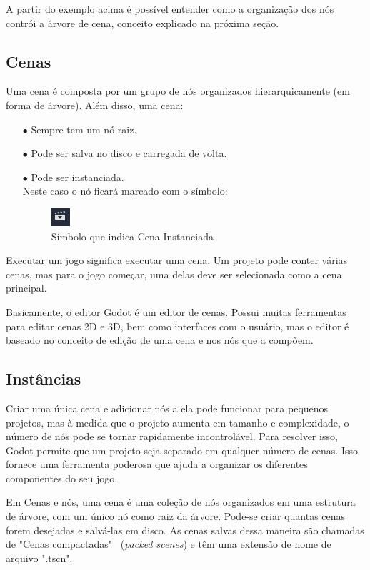 A partir do exemplo acima é possível entender como a organização dos nós
contrói a árvore de cena, conceito explicado na próxima seção.

\subsection{Cenas}

Uma cena é composta por um grupo de nós organizados hierarquicamente 
(em forma de árvore). Além disso, uma cena:

\begin{itemize}
    \item[$\bullet$]
        Sempre tem um nó raiz.
    \item[$\bullet$]
        Pode ser salva no disco e carregada de volta.
    \item[$\bullet$]
        Pode ser instanciada.\\
        Neste caso o nó ficará marcado com o símbolo:
        \begin{figure}[H]
            \includegraphics[scale=2]{../figuras/simbolo_instanciada.png}
            \caption{Símbolo que indica Cena Instanciada}
        \end{figure}
\end{itemize}
Executar um jogo significa executar uma cena. Um projeto pode conter várias 
cenas, mas para o jogo começar, uma delas deve ser selecionada como a cena 
principal.

Basicamente, o editor Godot é um editor de cenas. Possui muitas ferramentas para
editar cenas 2D e 3D, bem como interfaces com o usuário, mas o editor é baseado 
no conceito de edição de uma cena e nos nós que a compõem.

\subsection{Instâncias}

Criar uma única cena e adicionar nós a ela pode funcionar para pequenos 
projetos, mas à medida que o projeto aumenta em tamanho e complexidade, o número
de nós pode se tornar rapidamente incontrolável. Para resolver isso, Godot 
permite que um projeto seja separado em qualquer número de cenas. Isso fornece 
uma ferramenta poderosa que ajuda a organizar os diferentes componentes do seu
jogo.

Em Cenas e nós, uma cena é uma coleção de nós organizados em 
uma estrutura de árvore, com um único nó como raiz da árvore.
Pode-se criar quantas cenas forem desejadas e salvá-las em disco. As cenas salvas dessa
maneira são chamadas de "Cenas compactadas" \ (\textit{packed scenes}) e têm uma 
extensão de nome de arquivo ".tscn".

